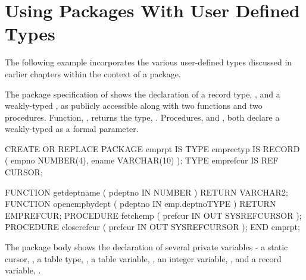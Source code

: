 \documentclass[letterpaper,10pt,english,openany,oneside]{sphinxmanual}
\begin{document}
\newpage


\section{Using Packages With User Defined Types}
\label{\detokenize{using_packages_with_user_defined_types:using-packages-with-user-defined-types}}\label{\detokenize{using_packages_with_user_defined_types::doc}}
The following example incorporates the various user-defined types
discussed in earlier chapters within the context of a package.

The package specification of  shows the declaration of a record
type, , and a weakly-typed , as
publicly accessible along with two functions and two procedures.
Function, , returns the  type, .
Procedures,  and , both declare a weakly-typed
 as a formal parameter.

%
\begin{sphinxVerbatim}[commandchars=\\\{\}]
CREATE OR REPLACE PACKAGE emp\PYGZus{}rpt
IS
   TYPE emprec\PYGZus{}typ IS RECORD (
       empno       NUMBER(4),
       ename       VARCHAR(10)
   );
   TYPE emp\PYGZus{}refcur IS REF CURSOR;

   FUNCTION get\PYGZus{}dept\PYGZus{}name (
       p\PYGZus{}deptno    IN NUMBER
   ) RETURN VARCHAR2;
   FUNCTION open\PYGZus{}emp\PYGZus{}by\PYGZus{}dept (
       p\PYGZus{}deptno    IN emp.deptno\PYGZpc{}TYPE
   ) RETURN EMP\PYGZus{}REFCUR;
   PROCEDURE fetch\PYGZus{}emp (
       p\PYGZus{}refcur    IN OUT SYS\PYGZus{}REFCURSOR
   );
   PROCEDURE close\PYGZus{}refcur (
       p\PYGZus{}refcur    IN OUT SYS\PYGZus{}REFCURSOR
   );
   END emp\PYGZus{}rpt;
\end{sphinxVerbatim}

The package body shows the declaration of several private variables - a
static cursor, , a table type, , a table variable,
, an integer variable, , and a record variable,
.
\end{document}
